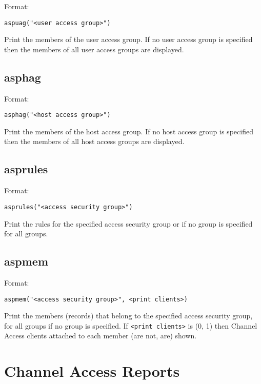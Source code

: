 Format:

\begin{verbatim}
aspuag("<user access group>")
\end{verbatim}

Print the members of the user access group.  If no user access group is specified then the members of all user access 
groups are displayed.

\subsection{asphag}

Format:

\begin{verbatim}
asphag("<host access group>")
\end{verbatim}

Print the members of the host access group.  If no host access group is specified then the members of all host access 
groups are displayed.

\subsection{asprules}

Format:

\begin{verbatim}
asprules("<access security group>")
\end{verbatim}

Print the rules for the specified access security group or if no group is specified for all groups.

\subsection{aspmem}

Format:

\begin{verbatim}
aspmem("<access security group>", <print clients>)
\end{verbatim}

Print the members (records) that belong to the specified access security group, for all groups if no group is specified.  If 
\verb|<print clients>| is (0, 1) then Channel Access clients attached to each member (are not, are) shown.

\section{Channel Access Reports}


